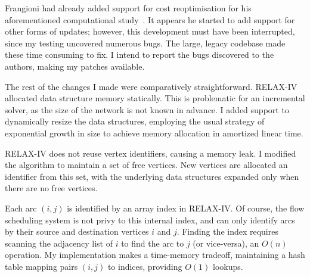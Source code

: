 
Frangioni had already added support for cost reoptimisation for his aforementioned computational study~\cite{Frangioni:2006}. It appears he started to add support for other forms of updates; however, this development must have been interrupted, since my testing uncovered numerous bugs. The large, legacy codebase made these time consuming to fix. I intend to report the bugs discovered to the authors, making my patches available.

The rest of the changes I made were comparatively straightforward. RELAX-IV allocated data structure memory statically. This is problematic for an incremental solver, as the size of the network is not known in advance. I added support to dynamically resize the data structures, employing the usual strategy of exponential growth in size to achieve memory allocation in amortized linear time\footnotemark.

RELAX-IV does not reuse vertex identifiers, causing a memory leak. I modified the algorithm to maintain a set of free vertices. New vertices are allocated an identifier from this set, with the underlying data structures expanded only when there are no free vertices.

Each arc $(i,j)$ is identified by an array index in RELAX-IV. Of course, the flow scheduling system is not privy to this internal index, and can only identify arcs by their source and destination vertices $i$ and $j$. Finding the index requires scanning the adjacency list of $i$ to find the arc to $j$ (or vice-versa), an $O(n)$ operation. My implementation makes a time-memory tradeoff, maintaining a hash table mapping pairs $(i,j)$ to indices, providing $O(1)$ lookups.

